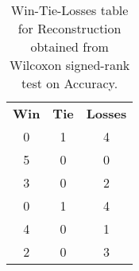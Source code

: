 \begin{table}
\centering
\caption{Win-Tie-Losses table for Reconstruction obtained from Wilcoxon signed-rank test on Accuracy.}
\label{tab:reconstruction_model_comparison_Accuracy}
\begin{tabular}{|c|c|c|}
\toprule
 \textbf{Win} &  \textbf{Tie} &  \textbf{Losses} \\
            0 &             1 &                4 \\
\midrule
            5 &             0 &                0 \\
            3 &             0 &                2 \\
            0 &             1 &                4 \\
            4 &             0 &                1 \\
            2 &             0 &                3 \\
\bottomrule
\end{tabular}
\end{table}
